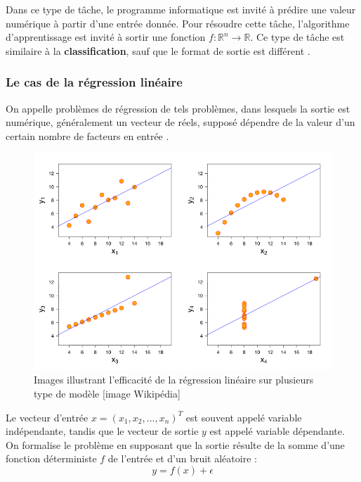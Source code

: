 	Dans ce type de tâche, le programme informatique est invité à prédire une valeur numérique à partir d'une entrée donnée. Pour résoudre cette tâche, l'algorithme d'apprentissage est invité à sortir une fonction $f : \mathbb{R}^n \rightarrow \mathbb{R}$. Ce type de tâche est similaire à la \textbf{classification}, sauf que le format de sortie est différent \cite{goodfellow2016deep}.
	
	
	
	
	\subsubsection{Le cas de la régression linéaire}
		On appelle problèmes de régression de tels problèmes, dans lesquels la sortie est numérique, généralement un vecteur de réels, supposé dépendre de la valeur d'un certain nombre de facteurs en entrée \cite{matloff2017statistical}.
		
		\begin{figure}[hth]%
			\centering
			\includegraphics[width=\textwidth]{images/linear_regression_quartet.png}
			\caption{Images illustrant l'efficacité de la régression linéaire sur plusieurs type de modèle [image Wikipédia]
			}
			\label{fig:linear_regression_quartet}
		\end{figure}
		
		Le vecteur d'entrée $x = (x_1,x_2,...,x_n)^T$ est souvent appelé variable indépendante, tandis que le vecteur de sortie $y$ est appelé variable dépendante. On formalise le problème en supposant que la sortie résulte de la somme d'une fonction déterministe $f$ de l'entrée et d'un bruit aléatoire :
		\begin{equation}
			y = f(x) + \epsilon
		\end{equation}
	
